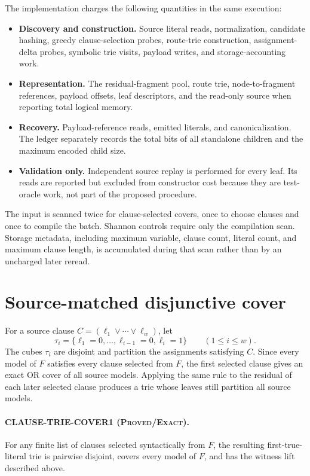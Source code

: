 \documentclass[11pt]{article}
\newcommand{\Exact}{\textnormal{\textsc{Proved/Exact}}}
\begin{document}
The implementation charges the following quantities in the same execution:
\begin{itemize}
\item[] \textbf{Discovery and construction.}  Source literal reads,
normalization, candidate hashing, greedy clause-selection probes, route-trie
construction, assignment-delta probes, symbolic trie visits, payload writes,
and storage-accounting work.
\item[] \textbf{Representation.}  The residual-fragment pool, route trie,
node-to-fragment references, payload offsets, leaf descriptors, and the
read-only source when reporting total logical memory.
\item[] \textbf{Recovery.}  Payload-reference reads, emitted literals, and
canonicalization.  The ledger separately records the total bits of all
standalone children and the maximum encoded child size.
\item[] \textbf{Validation only.}  Independent source replay is performed for
every leaf.  Its reads are reported but excluded from constructor cost because
they are test-oracle work, not part of the proposed procedure.
\end{itemize}

The input is scanned twice for clause-selected covers, once to choose clauses
and once to compile the batch.  Shannon controls require only the compilation
scan.  Storage metadata, including maximum variable, clause count, literal
count, and maximum clause length, is accumulated during that scan rather than
by an uncharged later reread.

\section{Source-matched disjunctive cover}

For a source clause $C=(\ell_1\vee\cdots\vee\ell_w)$, let
\[
 \tau_i=\{\ell_1=0,\ldots,\ell_{i-1}=0,\ell_i=1\}
 \qquad(1\le i\le w).
\]
The cubes $\tau_i$ are disjoint and partition the assignments satisfying
$C$.  Since every model of $F$ satisfies every clause selected from $F$, the
first selected clause gives an exact OR cover of all source models.  Applying
the same rule to the residual of each later selected clause produces a trie
whose leaves still partition all source models.

\paragraph{CLAUSE-TRIE-COVER1 (\Exact).}
For any finite list of clauses selected syntactically from $F$, the resulting
first-true-literal trie is pairwise disjoint, covers every model of $F$, and
has the witness lift described above.
\end{document}
